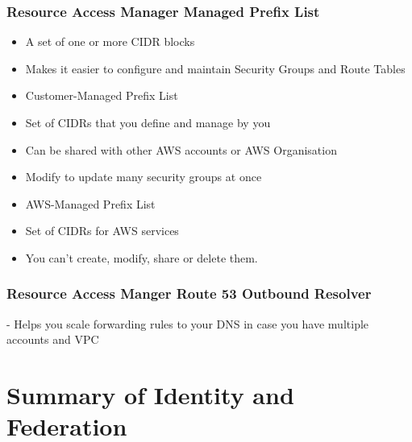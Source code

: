 \subsubsection{Resource Access Manager Managed Prefix List}
\begin{itemize}
    \item A set of one or more CIDR blocks
    \item Makes it easier to configure and maintain Security Groups and Route Tables
    \item Customer-Managed Prefix List
    \item Set of CIDRs that you define and manage by you
    \item Can be shared with other AWS accounts or AWS Organisation
    \item Modify to update many security groups at once
    \item AWS-Managed Prefix List
    \item Set of CIDRs for AWS services
    \item You can't create, modify, share or delete them.
\end{itemize}

\subsubsection{Resource Access Manger Route 53 Outbound Resolver}
- Helps you scale forwarding rules to your DNS in case you have multiple accounts and VPC


\section{Summary of Identity and Federation}

